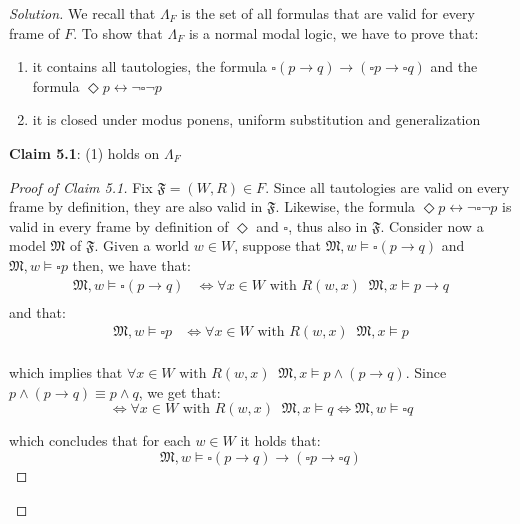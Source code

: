 \documentclass[12pt,a4paper]{report}
\theoremstyle{definition}
\newcommand{\model}[1]{\mathfrak{#1}}           %
\begin{document}
    \begin{proof}[Solution]
        We recall that $\Lambda_{F}$ is the set of all formulas that are valid for every frame of $F$. To show that $\Lambda_{F}$ is a normal modal logic, we have to prove that:
        \begin{enumerate}[label={(\arabic*)}]
            \item it contains all tautologies, the formula $\square(p \to q) \to (\square p \to \square q)$ and the formula $\Diamond p \leftrightarrow \lnot \square \lnot p$
            \item it is closed under modus ponens, uniform substitution and generalization 
        \end{enumerate}

        \textbf{Claim 5.1}: (1) holds on $\Lambda_{F}$
        
        \begin{proof}[Proof of Claim 5.1]
            
            Fix $\model{F} = (W,R) \in F$. Since all tautologies are valid on every frame by definition, they are also valid in $\model{F}$. Likewise, the formula $\Diamond p \leftrightarrow \lnot \square \lnot p$ is valid in every frame by definition of $\Diamond$ and $\square$, thus also in $\model{F}$. Consider now a model $\model{M}$ of $\model{F}$. Given a world $w \in W$, suppose that $\model{M}, w \models \square(p \to q)$ and $\model{M}, w \models \square p$ then, we have that:
            \[\begin{split}
                \model{M}, w \models \square(p \to q) & \iff \forall x \in W \text{ with } R(w,x) \;\; \model{M}, x \models p \to q \\
            \end{split}\]
            and that:
            \[\begin{split}
                \model{M}, w \models \square p & \iff \forall x \in W \text{ with } R(w,x) \;\; \model{M}, x \models p \\
            \end{split}\]

            which implies that $\forall x \in W \text{ with } R(w,x) \;\; \model{M}, x \models p \land (p \to q)$. Since $p \land (p \to q) \equiv p \land q$, we get that:
            \[\iff \forall x \in W \text{ with } R(w,x) \;\; \model{M}, x \models q \iff \model{M}, w \models \square q\]
            
            which concludes that for each $w \in W$ it holds that:
            \[\model{M}, w \models \square(p \to q) \to (\square p \to \square q)\]


\end{proof}
\end{proof}
\end{document}
